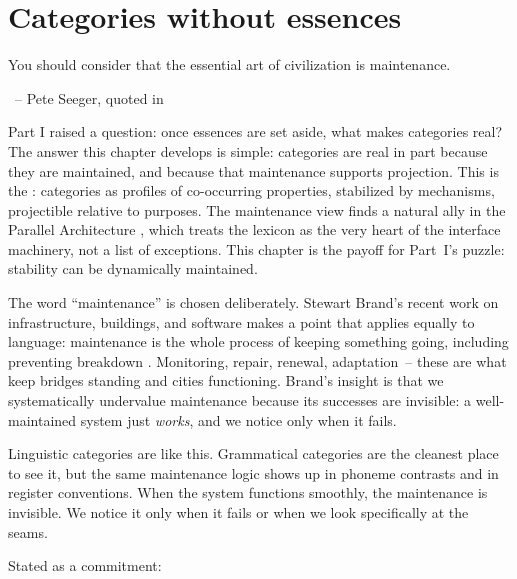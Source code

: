 
\chapter{Categories without essences}
\label{ch:kinds-without-essences}

\epigraph{You should consider that the essential art of civilization is maintenance.}{~-- Pete Seeger, quoted in \textcite{brand2024}}

Part I raised a question: once essences are set aside, what makes categories real? The answer this chapter develops is simple: categories are real in part because they are maintained, and because that maintenance supports projection. This is the : categories as profiles of co-occurring properties, stabilized by mechanisms, projectible relative to purposes. The maintenance view finds a natural ally in the Parallel Architecture \parencite{jackendoff2002, jackendoff2010meaning}, which treats the lexicon as the very heart of the interface machinery, not a list of exceptions. This chapter is the payoff for Part~I's puzzle: stability can be dynamically maintained.

The word \enquote{maintenance} is chosen deliberately. Stewart Brand's recent work on infrastructure, buildings, and software makes a point that applies equally to language: maintenance is the whole process of keeping something going, including preventing breakdown \citep{brand2024}. Monitoring, repair, renewal, adaptation~-- these are what keep bridges standing and cities functioning. Brand's insight is that we systematically undervalue maintenance because its successes are invisible: a well-maintained system just \emph{works}, and we notice only when it fails.

Linguistic categories are like this. Grammatical categories are the cleanest place to see it, but the same maintenance logic shows up in phoneme contrasts and in register conventions. When the system functions smoothly, the maintenance is invisible. We notice it only when it fails or when we look specifically at the seams.

Stated as a commitment:


